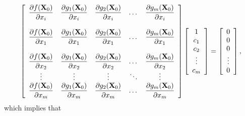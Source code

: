 \documentclass{article}
\newcommand{\dst}{\displaystyle}
\begin{document}
\begin{equation} \label{eq:36}
\left[\begin{array}{ccccccc}
\dst{\frac{\partial f({\bf X}_{0})}{\partial x_{i}}}&
\dst{\frac{\partial g_{1}({\bf X}_{0})}{\partial x_{i}}}&
\dst{\frac{\partial g_{2}({\bf X}_{0})}{\partial x_{i}}}&\dots&
\dst{\frac{\partial g_{m}({\bf X}_{0})}{\partial x_{i}}}\\\\
\dst{\frac{\partial f({\bf X}_{0})}{\partial x_{1}}}&
\dst{\frac{\partial g_{1}({\bf X}_{0})}{\partial x_{1}}}&
\dst{\frac{\partial g_{2}({\bf X}_{0})}{\partial x_{1}}}&\dots&
\dst{\frac{\partial g_{m}({\bf X}_{0})}{\partial x_{1}}}\\\\
\dst{\frac{\partial f({\bf X}_{0})}{\partial x_{2}}}&
\dst{\frac{\partial g_{1}({\bf X}_{0})}{\partial x_{2}}}&
\dst{\frac{\partial g_{2}({\bf X}_{0})}{\partial x_{2}}}&\dots&
\dst{\frac{\partial g_{m}({\bf X}_{0})}{\partial x_{2}}}\\
\vdots&\vdots&\vdots&\ddots&\vdots\\
\dst{\frac{\partial f({\bf X}_{0})}{\partial x_{m}}}&
\dst{\frac{\partial g_{1}({\bf X}_{0})}{\partial x_{m}}}&
\dst{\frac{\partial g_{2}({\bf X}_{0})}{\partial x_{m}}}&\dots&
\dst{\frac{\partial g_{m}({\bf X}_{0})}{\partial x_{m}}}\\
\end{array}\right]
\left[\begin{array}{ccccccc}
1\\c_{1}\\c_{2}\\\vdots\\c_{m}
\end{array}\right]=
\left[\begin{array}{ccccccc}
0\\0\\0\\\vdots\\0
\end{array}\right],
\end{equation}
which implies that
\end{document}
